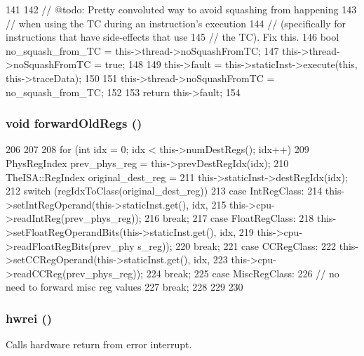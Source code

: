 \begin{DoxyCode}
141 {
142     // @todo: Pretty convoluted way to avoid squashing from happening
143     // when using the TC during an instruction's execution
144     // (specifically for instructions that have side-effects that use
145     // the TC).  Fix this.
146     bool no_squash_from_TC = this->thread->noSquashFromTC;
147     this->thread->noSquashFromTC = true;
148 
149     this->fault = this->staticInst->execute(this, this->traceData);
150 
151     this->thread->noSquashFromTC = no_squash_from_TC;
152 
153     return this->fault;
154 }
\end{DoxyCode}
\hypertarget{classBaseO3DynInst_ac07a6c1a7a4d279a8b360729e0777208}{
\subsubsection[{forwardOldRegs}]{\setlength{\rightskip}{0pt plus 5cm}void forwardOldRegs ()}}
\label{classBaseO3DynInst_ac07a6c1a7a4d279a8b360729e0777208}



\begin{DoxyCode}
206     {
207 
208         for (int idx = 0; idx < this->numDestRegs(); idx++) {
209             PhysRegIndex prev_phys_reg = this->prevDestRegIdx(idx);
210             TheISA::RegIndex original_dest_reg =
211                 this->staticInst->destRegIdx(idx);
212             switch (regIdxToClass(original_dest_reg)) {
213               case IntRegClass:
214                 this->setIntRegOperand(this->staticInst.get(), idx,
215                                        this->cpu->readIntReg(prev_phys_reg));
216                 break;
217               case FloatRegClass:
218                 this->setFloatRegOperandBits(this->staticInst.get(), idx,
219                                              this->cpu->readFloatRegBits(prev_phy
      s_reg));
220                 break;
221               case CCRegClass:
222                 this->setCCRegOperand(this->staticInst.get(), idx,
223                                       this->cpu->readCCReg(prev_phys_reg));
224                 break;
225               case MiscRegClass:
226                 // no need to forward misc reg values
227                 break;
228             }
229         }
230     }
\end{DoxyCode}
\hypertarget{classBaseO3DynInst_a5f42e07ae335dff417664e91518c7f1e}{
\subsubsection[{hwrei}]{ hwrei ()}}
\label{classBaseO3DynInst_a5f42e07ae335dff417664e91518c7f1e}
Calls hardware return from error interrupt. 


